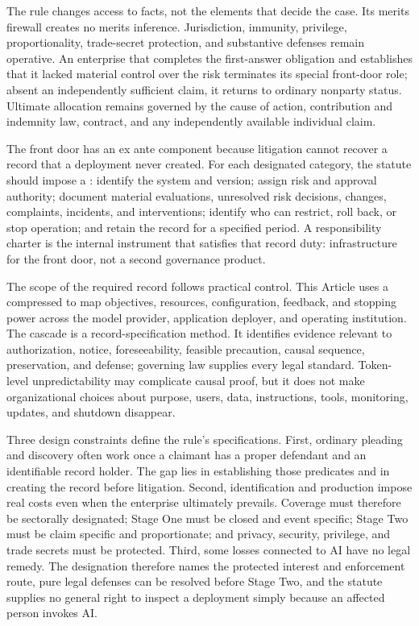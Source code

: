 The rule changes access to facts, not the elements that decide the case. Its merits firewall creates no merits inference. Jurisdiction, immunity, privilege, proportionality, trade-secret protection, and substantive defenses remain operative. An enterprise that completes the first-answer obligation and establishes that it lacked material control over the risk terminates its special front-door role; absent an independently sufficient claim, it returns to ordinary nonparty status. Ultimate allocation remains governed by the cause of action, contribution and indemnity law, contract, and any independently available individual claim.

The front door has an ex ante component because litigation cannot recover a record that a deployment never created. For each designated category, the statute should impose a : identify the system and version; assign risk and approval authority; document material evaluations, unresolved risk decisions, changes, complaints, incidents, and interventions; identify who can restrict, roll back, or stop operation; and retain the record for a specified period. A responsibility charter is the internal instrument that satisfies that record duty: infrastructure for the front door, not a second governance product.

The scope of the required record follows practical control. This Article uses a compressed  to map objectives, resources, configuration, feedback, and stopping power across the model provider, application deployer, and operating institution. The cascade is a record-specification method. It identifies evidence relevant to authorization, notice, foreseeability, feasible precaution, causal sequence, preservation, and defense; governing law supplies every legal standard. Token-level unpredictability may complicate causal proof, but it does not make organizational choices about purpose, users, data, instructions, tools, monitoring, updates, and shutdown disappear.

Three design constraints define the rule's specifications. First, ordinary pleading and discovery often work once a claimant has a proper defendant and an identifiable record holder. The gap lies in establishing those predicates and in creating the record before litigation. Second, identification and production impose real costs even when the enterprise ultimately prevails. Coverage must therefore be sectorally designated; Stage One must be closed and event specific; Stage Two must be claim specific and proportionate; and privacy, security, privilege, and trade secrets must be protected. Third, some losses connected to AI have no legal remedy. The designation therefore names the protected interest and enforcement route, pure legal defenses can be resolved before Stage Two, and the statute supplies no general right to inspect a deployment simply because an affected person invokes AI.

